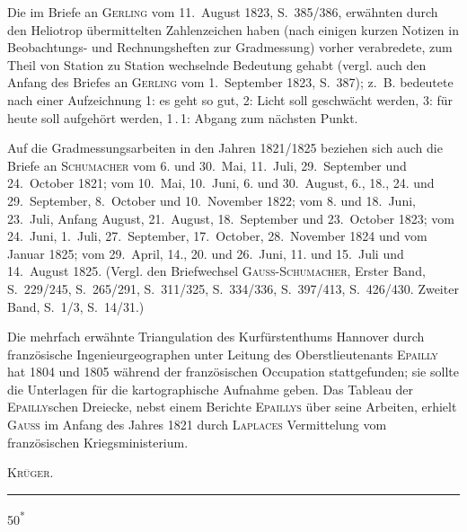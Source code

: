 \par\noindent\hspace*{\parindent}Die im Briefe an \textsc{Gerling} vom 11.~August 1823, S.~385/386, erwähnten durch den Heliotrop übermittelten Zahlenzeichen haben (nach einigen kurzen Notizen in Beobachtungs- und Rechnungsheften zur Gradmessung) vorher verabredete, zum Theil von Station zu Station wechselnde Bedeutung gehabt (vergl. auch den Anfang des Briefes an \textsc{Gerling} vom 1.~September 1823, S.~387); z.~B. bedeutete nach einer Aufzeichnung 1: es geht so gut, 2: Licht soll geschwächt werden, 3: für heute soll aufgehört werden, 1\,.\,1: Abgang zum nächsten Punkt.
\par\noindent\hspace*{\parindent}Auf die Gradmessungsarbeiten in den Jahren 1821/1825 beziehen sich auch die Briefe an \textsc{Schumacher} vom 6. und 30.~Mai, 11.~Juli, 29.~September und 24.~October 1821; vom 10.~Mai, 10.~Juni, 6. und 30.~August, 6., 18., 24. und 29.~September, 8.~October und 10.~November 1822; vom 8. und 18.~Juni, 23.~Juli, Anfang August, 21.~August, 18.~September und 23.~October 1823; vom 24.~Juni, 1.~Juli, 27.~September, 17.~October, 28.~November 1824 und vom Januar 1825; vom 29.~April, 14., 20. und 26.~Juni, 11. und 15.~Juli und 14.~August 1825. (Vergl. den Briefwechsel \textsc{Gauss-Schumacher}, Erster Band, S.~229/245, S.~265/291, S.~311/325, S.~334/336, S.~397/413, S.~426/430. Zweiter Band, S.~1/3, S.~14/31.)
\par\noindent\hspace*{\parindent}Die mehrfach erwähnte Triangulation des Kurfürstenthums Hannover durch französische Ingenieurgeographen unter Leitung des Oberstlieutenants \textsc{Epailly} hat 1804 und 1805 während der französischen Occupation stattgefunden; sie sollte die Unterlagen für die kartographische Aufnahme geben. Das Tableau der \textsc{Epailly}schen Dreiecke, nebst einem Berichte \textsc{Epaillys} über seine Arbeiten, erhielt \textsc{Gauss} im Anfang des Jahres 1821 durch \textsc{Laplaces} Vermittelung vom französischen Kriegsministerium.
\par\noindent\hfill\textsc{Krüger}.\par
\endgroup
\begin{center}\rule{.12\linewidth}{.4pt}\end{center}
\vfill\noindent\hfill 50\textsuperscript{*}\hspace*{1.5em}\par

